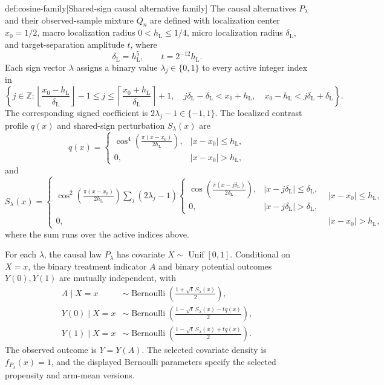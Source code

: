 \begin{definitionv}{def:cosine-family}[Shared-sign causal alternative family]
The causal alternatives \(P_\lambda\) and their observed-sample mixture \(Q_n\) are defined with localization center \(x_0=1/2\), macro localization radius \(0<h_{\mathrm L}\le 1/4\), micro localization radius \(\delta_{\mathrm L}\), and target-separation amplitude \(t\), where
\[
\delta_{\mathrm L}=h_{\mathrm L}^{5},
\qquad
t=2^{-12}h_{\mathrm L}.
\]
Each sign vector \(\lambda\) assigns a binary value \(\lambda_j\in\{0,1\}\) to every active integer index in
\[
\left\{
j\in\mathbb Z:
\left\lfloor\frac{x_0-h_{\mathrm L}}{\delta_{\mathrm L}}\right\rfloor-1
\le j\le
\left\lceil\frac{x_0+h_{\mathrm L}}{\delta_{\mathrm L}}\right\rceil+1,\quad
j\delta_{\mathrm L}-\delta_{\mathrm L}<x_0+h_{\mathrm L},\quad
x_0-h_{\mathrm L}<j\delta_{\mathrm L}+\delta_{\mathrm L}
\right\}.
\]
The corresponding signed coefficient is \(2\lambda_j-1\in\{-1,1\}\). The localized contrast profile \(q(x)\) and shared-sign perturbation \(S_\lambda(x)\) are
\[
q(x)=
\begin{cases}
\displaystyle
\cos^{4}\!\left(\frac{\pi(x-x_0)}{2h_{\mathrm L}}\right),
& |x-x_0|\le h_{\mathrm L},\\
0,& |x-x_0|>h_{\mathrm L},
\end{cases}
\]
and
\[
S_\lambda(x)=
\begin{cases}
\displaystyle
\cos^{2}\!\left(\frac{\pi(x-x_0)}{2h_{\mathrm L}}\right)
\sum_j(2\lambda_j-1)
\begin{cases}
\displaystyle
\cos\!\left(\frac{\pi(x-j\delta_{\mathrm L})}{2\delta_{\mathrm L}}\right),
& |x-j\delta_{\mathrm L}|\le\delta_{\mathrm L},\\
0,& |x-j\delta_{\mathrm L}|>\delta_{\mathrm L},
\end{cases}
& |x-x_0|\le h_{\mathrm L},\\
0,& |x-x_0|>h_{\mathrm L},
\end{cases}
\]
where the sum runs over the active indices above.

For each \(\lambda\), the causal law \(P_\lambda\) has covariate \(X\sim\operatorname{Unif}[0,1]\). Conditional on \(X=x\), the binary treatment indicator \(A\) and binary potential outcomes \(Y(0),Y(1)\) are mutually independent, with
\[
\begin{aligned}
A\mid X=x
&\sim\operatorname{Bernoulli}
\left(\frac{1+\sqrt t\,S_\lambda(x)}{2}\right),\\
Y(0)\mid X=x
&\sim\operatorname{Bernoulli}
\left(\frac{1-\sqrt t\,S_\lambda(x)-tq(x)}{2}\right),\\
Y(1)\mid X=x
&\sim\operatorname{Bernoulli}
\left(\frac{1-\sqrt t\,S_\lambda(x)+tq(x)}{2}\right).
\end{aligned}
\]
The observed outcome is \(Y=Y(A)\). The selected covariate density is \(f_{P_\lambda}(x)=1\), and the displayed Bernoulli parameters specify the selected propensity and arm-mean versions.


\end{definitionv}
